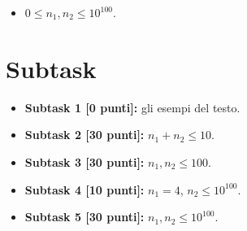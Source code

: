 


\begin{itemize}[nolistsep, noitemsep]
  \item $0 \le n_1, n_2 \le 10^{100}$.
\end{itemize}

  \section*{Subtask}
  \begin{itemize}
    \item \textbf{Subtask 1 [0 punti]:} gli esempi del testo.
    \item \textbf{Subtask 2 [30 punti]:} $n_1+n_2 \leq 10$.
    \item \textbf{Subtask 3 [30 punti]:} $n_1, n_2  \leq 100$.
    \item \textbf{Subtask 4 [10 punti]:} $n_1 = 4$, $n_2 \leq 10^{100}$.
    \item \textbf{Subtask 5 [30 punti]:} $n_1, n_2  \leq 10^{100}$.
  \end{itemize}
  
